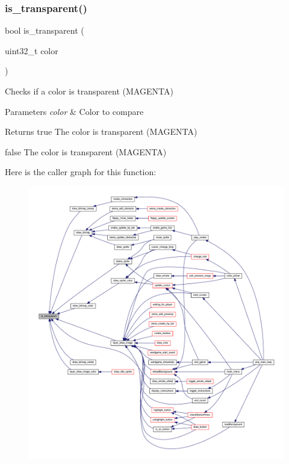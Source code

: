 \subsubsection{\texorpdfstring{is\+\_\+transparent()}{is\_transparent()}}
{\footnotesize\ttfamily bool is\+\_\+transparent (\begin{DoxyParamCaption}\item[{uint32\+\_\+t}]{color }\end{DoxyParamCaption})}



Checks if a color is transparent (M\+A\+G\+E\+N\+TA) 


\begin{DoxyParams}{Parameters}
{\em color} & Color to compare \\
\hline
\end{DoxyParams}
\begin{DoxyReturn}{Returns}
true The color is transparent (M\+A\+G\+E\+N\+TA) 

false The color is transparent (M\+A\+G\+E\+N\+TA) 
\end{DoxyReturn}
Here is the caller graph for this function\+:\nopagebreak
\begin{figure}[H]
\begin{center}
\leavevmode
\includegraphics[width=350pt]{group__bitmap_ga4b5b3aefecdb54bfdadbe4995b979c7f_icgraph}
\end{center}
\end{figure}
\mbox{\label{group__bitmap_ga627d64d58e9bf487fb6e326ea65df57b}} 
